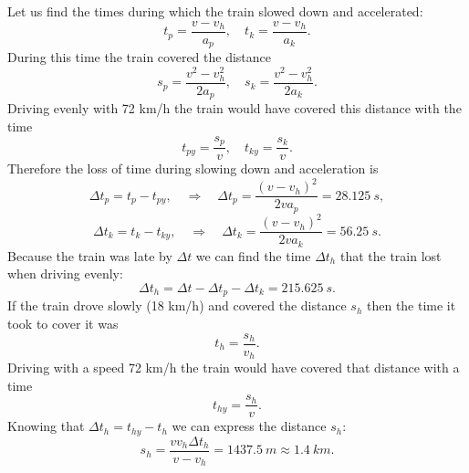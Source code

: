 {\ifEngSolution
Let us find the times during which the train slowed down and accelerated:
\[ t_p = \frac{v - v_h}{a_p},\quad t_k = \frac{v-v_h}{a_k}. \]
During this time the train covered the distance
\[ s_p = \frac{v^2-v_h^2}{2a_p}, \quad s_k = \frac{v^2-v_h^2}{2a_k}. \]
Driving evenly with 72 km/h the train would have covered this distance with the time
\[ t_{py} = \frac{s_p}{v},\quad t_{ky} =\frac{s_k}{v}. \]
Therefore the loss of time during slowing down and acceleration is
\[ \Delta t_p =  t_{p} - t_{py}, \quad\Rightarrow\quad \Delta t_p = \frac{(v-v_h)^2}{2va_p}=\SI{28,125}{s},\]
\[ \Delta t_k =  t_{k} - t_{ky}, \quad\Rightarrow\quad \Delta t_k = \frac{(v-v_h)^2}{2va_k}=\SI{56,25}{s}.\]
Because the train was late by $\Delta t$ we can find the time $\Delta t_h$ that the train lost when driving evenly:
\[ \Delta t_h = \Delta t - \Delta t_p - \Delta t_k = \SI{215,625}{s}. \]
If the train drove slowly (18 km/h) and covered the distance $s_h$ then the time it took to cover it was
\[ t_h = \frac{s_h}{v_h}. \] 
Driving with a speed 72 km/h the train would have covered that distance with a time
\[ t_{hy} = \frac{s_h}{v}. \]
Knowing that $\Delta t_h = t_{hy} - t_h$ we can express the distance $s_h$:
\[ s_h = \frac{vv_h\Delta t_h}{v-v_h} = \SI{1437,5}{m} \approx \SI{1,4}{km}.\]
\fi
}